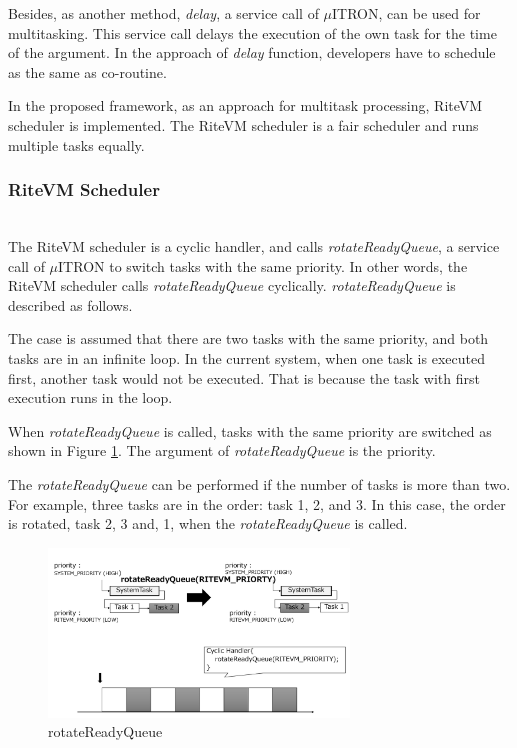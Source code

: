 \documentclass[conference,compsoc]{IEEEtran}
\begin{document}
Besides, as another method, {\it delay}, a service call of $\mu$ITRON, can be used for multitasking.
This service call delays the execution of the own task for the time of the argument.
In the approach of {\it delay} function, developers have to schedule as the same as co-routine.

In the proposed framework, as an approach for multitask processing, RiteVM scheduler is implemented.
The RiteVM scheduler is a fair scheduler and runs multiple tasks equally. 

\subsubsection{RiteVM Scheduler} \mbox{}\\

The RiteVM scheduler is a cyclic handler, and calls {\it rotateReadyQueue}, a service call of $\mu$ITRON to switch tasks with the same priority.
In other words, the RiteVM scheduler calls {\it rotateReadyQueue} cyclically.
{\it rotateReadyQueue} is described as follows.

The case is assumed that there are two tasks with the same priority, and both tasks are in an infinite loop.
In the current system, when one task is executed first, another task would not be executed.
That is because the task with first execution runs in the loop.

When {\it rotateReadyQueue} is called, tasks with the same priority are switched as shown in Figure \ref{fig:rotateReadyQueue}.
The argument of {\it rotateReadyQueue} is the priority.

The {\it rotateReadyQueue} can be performed if the number of tasks is more than two.
For example, three tasks are in the order: task 1, 2, and 3.
In this case, the order is rotated, task 2, 3 and, 1, when the {\it rotateReadyQueue} is called.

\begin{figure}[t]
    \centering
    \includegraphics[width=8cm,clip]{figure/rotateReadyQueue.pdf}
    \caption{rotateReadyQueue}
    \label{fig:rotateReadyQueue}
\end{figure} 
 
\end{document}
